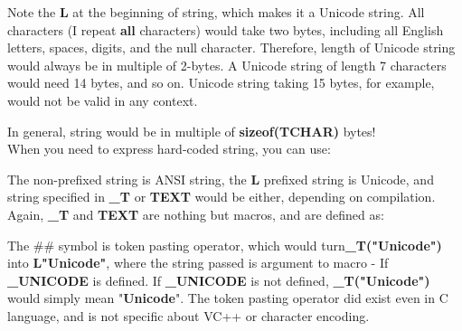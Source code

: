 	
	Note the \textbf{L} at the beginning of string, which makes it a Unicode string. All characters (I repeat \textbf{all} characters) would take two bytes, including all English letters, spaces, digits, and the null character. Therefore, length of Unicode string would always be in multiple of 2-bytes. A Unicode string of length 7 characters would need 14 bytes, and so on. Unicode string taking 15 bytes, for example, would not be valid in any context.
	
	In general, string would be in multiple of \textbf{sizeof(TCHAR)} bytes!\\
	
	When you need to express hard-coded string, you can use:\\
	
	
	The non-prefixed string is ANSI string, the \textbf{L} prefixed string is Unicode, and string specified in \textbf{\_T} or \textbf{TEXT} would be either, depending on compilation. Again, \textbf{\_T} and \textbf{TEXT} are nothing but macros, and are defined as:
	
	
	The \#\# symbol is token pasting operator, which would turn\textbf{\_T("Unicode")} into \textbf{L"Unicode"}, where the string passed is argument to macro - If \textbf{\_UNICODE} is defined. If \textbf{\_UNICODE} is not defined, \textbf{\_T("Unicode")} would simply mean "\textbf{Unicode}". The token pasting operator did exist even in C language, and is not specific about VC++ or character encoding.\\
	

